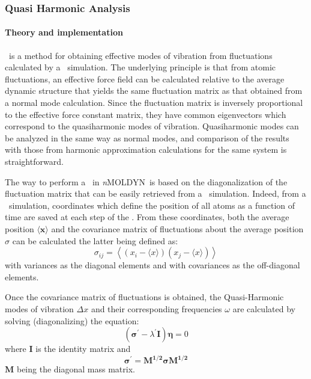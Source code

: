 \documentclass[a4paper,11pt]{report}
\newcommand{\NMOLDYN}{\textit{n}MOLDYN}
\begin{document}
\subsubsection{Quasi Harmonic Analysis}
\label{qha}
\paragraph{Theory and implementation\\}
\label{qha_theory}
\QHA\ is a method for obtaining effective modes of vibration from fluctuations calculated by a \MD\ 
simulation. The underlying principle is that from atomic fluctuations, an effective force field can be calculated 
relative to the average dynamic structure that yields the same fluctuation matrix as that obtained from a normal mode 
calculation. Since the fluctuation matrix is inversely proportional to the effective force constant matrix, they have common 
eigenvectors which correspond to the quasiharmonic modes of vibration. Quasiharmonic modes  can be analyzed in the same way 
as normal modes, and comparison of the results with those from harmonic approximation calculations for the same system is 
straightforward.

The way to perform a \QHA\ in \NMOLDYN\ is based on the diagonalization of the fluctuation matrix that can be easily retrieved 
from a \MD\ simulation. Indeed, from a \MD\ simulation, coordinates which define the position of all atoms as a function of time are
saved at each step of the \MD . From these coordinates, both the average position $\langle \mathbf{x} \rangle$ and the 
covariance matrix of fluctuations about the average position $\sigma$  can be calculated the latter being defined as:
\begin{equation}
\sigma_{ij} = \left\langle \left ( x_{i} - \langle x \rangle \right ) \left ( x_{j} - \langle x \rangle \right )\right\rangle
\end{equation}
with variances as the diagonal elements and with covariances as the off-diagonal elements.

Once the covariance matrix of fluctuations is obtained, the Quasi-Harmonic modes of vibration $\Delta x$ and their 
corresponding frequencies $\omega$ are calculated by solving (diagonalizing) the equation:
\begin{equation}
\label{eq:qha}
\left ( \mathbf{\sigma^{\prime}} - \lambda^{\prime} \mathbf{I}\right )\mathbf{\eta} = 0
\end{equation}
where $\mathbf{I}$ is the identity matrix and 
\begin{equation}
\mathbf{\sigma^{\prime}} = \mathbf{M^{1/2}} \mathbf{\sigma} \mathbf{M^{1/2}}
\end{equation}
$\mathbf{M}$ being the diagonal mass matrix.
\end{document}
